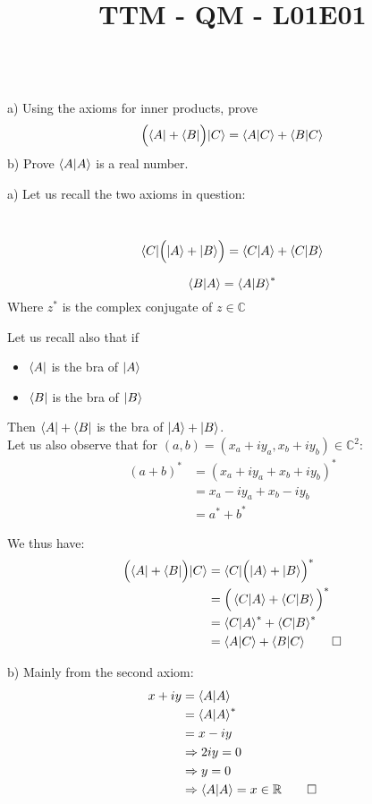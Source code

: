 \documentclass[solutions.tex]{subfiles}
\title{TTM - QM - L01E01}
\begin{document}
\maketitle
\begin{exercise}\ \\
a) Using the axioms for inner products, prove
$$ \Big( \langle A| + \langle B|\Big) |C\rangle = \left\langle A \middle| C \right\rangle + \left\langle B \middle| C \right\rangle $$
b) Prove $\left\langle A \middle| A \right\rangle$ is a real number.
\end{exercise}
\hrr

a) Let us recall the two axioms in question:
\begin{axiom}\ \\
$$ \langle C| \Big( |A\rangle + |B\rangle \Big) = \left\langle C \middle| A \right\rangle + \left\langle C \middle| B \right\rangle $$
\end{axiom}
\begin{axiom}
$$ \left\langle B \middle| A \right\rangle = \left\langle A \middle| B \right\rangle^{*} $$
Where $z^{*}$ is the complex conjugate of $z\in\mathbb{C}$
\end{axiom}

Let us recall also that if
\begin{itemize}
	\item $\langle A|$ is the bra of $|A\rangle$
	\item $\langle B|$ is the bra of $|B\rangle$
\end{itemize}
Then $\langle A|+\langle B|$ is the bra of $|A\rangle+|B\rangle$. \\

Let us also observe that for
$(a, b) = (x_a+iy_a, x_b+iy_b) \in\mathbb{C}^2$:
\begin{align*}
	(a+b)^* &= (x_a+iy_a+x_b+iy_b)^* \\
	~ &= x_a-iy_a+x_b-iy_b \\
	~ &= a^* + b^*
\end{align*}

We thus have:
\begin{align*}
	\Big( \langle A| + \langle B|\Big) |C\rangle &= \langle C|\Big( |A\rangle + |B\rangle\Big)^* \\
	~ &= \Big(\left\langle C \middle| A \right\rangle + \left\langle C \middle| B \right\rangle\Big)^* \\
	~ &= \left\langle C \middle| A \right\rangle^* + \left\langle C \middle| B \right\rangle^* \\
	~ &= \left\langle A \middle| C \right\rangle + \left\langle B \middle| C \right\rangle \qed
\end{align*}

b) Mainly from the second axiom:
\begin{align*}
	x+iy &= \left\langle A \middle| A \right\rangle \\
	~ &= \left\langle A \middle| A \right\rangle^* \\
	~ &= x-iy \\
	~ &\Rightarrow 2iy = 0 \\
	~ &\Rightarrow y = 0 \\
	~ &\Rightarrow \left\langle A \middle| A \right\rangle=x\in\mathbb{R}\qed
\end{align*}
\end{document}

